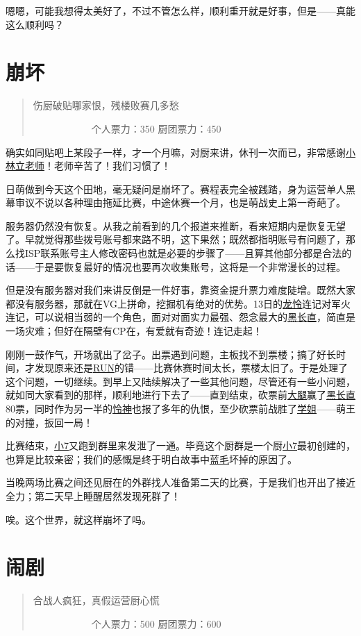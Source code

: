 嗯嗯，可能我想得太美好了，不过不管怎么样，顺利重开就是好事，但是——真能这么顺利吗？

\chapter{崩坏}
\begin{quote}
伤厨破贴哪家恨，残楼败赛几多愁

　　　　　　个人票力：350 厨团票力：450
\end{quote}

确实如同贴吧上某段子一样，才一个月嘛，对厨来讲，休刊一次而已，非常感谢\uline{小林立老师}！老师辛苦了！我们习惯了！

日萌做到今天这个田地，毫无疑问是崩坏了。赛程表完全被践踏，身为运营单人黑幕审议不说以各种理由拖延比赛，中途休赛一个月，也是萌战史上第一奇葩了。

服务器仍然没有恢复。从我之前看到的几个报道来推断，看来短期内是恢复无望了。早就觉得那些拨号账号都来路不明，这下果然；既然都指明账号有问题了，那么找ISP联系账号主人修改密码也就是必要的步骤了——且算其他部分都是合法的话——于是要恢复最好的情况也要再次收集账号，这将是一个非常漫长的过程。

但是没有服务器对我们来讲反倒是一件好事，靠资金提升票力难度陡增。既然大家都没有服务器，那就在VG上拼命，挖掘机有绝对的优势。13日的\uline{龙}\uline{怜}连记对军火连记，可以说相当弱的一个角色，面对对面实力最强、怨念最大的\uline{黑长直}，简直是一场灾难；但好在隔壁有CP在，有爱就有奇迹！连记走起！

刚刚一鼓作气，开场就出了岔子。出票遇到问题，主板找不到票楼；搞了好长时间，才发现原来还是\uline{RUN}的错——比赛休赛时间太长，票楼太旧了。于是处理了这个问题，一切继续。到早上又陆续解决了一些其他问题，尽管还有一些小问题，就如同大家看到的那样，顺利地进行下去了——直到结束，砍票前\uline{大腿}赢了\uline{黑长直}80票，同时作为另一半的\uline{怜神}也报了多年的仇恨，至少砍票前战胜了\uline{学姐}——萌王的对撞，扳回一局！

比赛结束，\uline{小7}又跑到群里来发泄了一通。毕竟这个厨群是一个厨\uline{小7}最初创建的，也算是比较亲密；我们的感慨是终于明白故事中\uline{蓝毛}坏掉的原因了。

当晚两场比赛之间还见厨在的外群找人准备第二天的比赛，于是我们也开出了接近全力；第二天早上睡醒居然发现死群了！

唉。这个世界，就这样崩坏了吗。

\chapter{闹剧}
\begin{quote}
合战人疯狂，真假运营厨心慌

　　　　　　个人票力：500 厨团票力：600
\end{quote}

